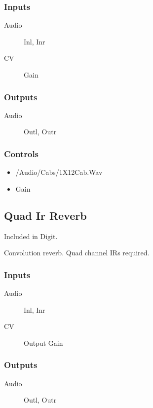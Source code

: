 \subsubsection{Inputs}
\begin{description}
\item [Audio] Inl, Inr
\item [CV] Gain
\end{description}

\subsubsection{Outputs}
\begin{description}
\item [Audio] Outl, Outr
\end{description}

\subsubsection{Controls}
\begin{itemize}
\item /Audio/Cabs/1X12Cab.Wav
\item Gain
\end{itemize}

\subsection{Quad Ir Reverb}

Included in Digit.

Convolution reverb. Quad channel IRs required.



\subsubsection{Inputs}
\begin{description}
\item [Audio] Inl, Inr
\item [CV] Output Gain
\end{description}

\subsubsection{Outputs}
\begin{description}
\item [Audio] Outl, Outr
\end{description}

